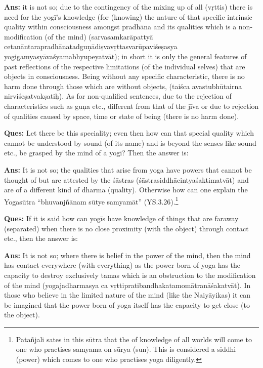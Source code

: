 \textbf{Ans:} it is not so; due to the contingency of the mixing up of all (vṛttis) there is need for the yogī’s knowledge (for (knowing) the nature of that specific intrinsic quality within consciousness amongst pradhāna and its qualities which is a non-modification (of the mind) (sarvasamkarāpattyā cetanāntarapradhānatadguṇādiṣvavṛttasvarūpaviśeṣasya yogi\-gamyasyāvaśyamabhyupeyatvāt); in short it is only the general features of past reflections of the respective limitations (of the individual selves) that are objects in consciousness. Being without any specific characteristic, there is no harm done through those which are without objects, (taiśca avastubhūtairna nirviśeṣatvakṣatiḥ). As for non-qualified sentences, due to the rejection of characteristics such as guṇa etc., different from that of the jīva or due to rejection of qualities caused by space, time or state of being (there is no harm done).

\textbf{Ques:}  Let there be this speciality; even then how can that special quality which cannot be understood by sound (of its name) and is beyond the senses like sound etc., be grasped by the mind of a yogī? Then the answer is: 

\textbf{Ans:} It is not so; the qualities that arise from yoga have powers that cannot be thought of but are attested by the śāstras (śāstrasiddhācintyaśaktimatvāt) and are of a different kind of dharma (quality). Otherwise how can one explain the Yogasūtra “bhuvanjñānam sūtye samyamāt” (YS.3.26).\footnote{Patañjali sates in this sūtra that the of knowledge of all worlds will come to one who practises samyama on sūrya (sun). This is considered a siddhi (power) which comes to one who practises yoga diligently.} 

\textbf{Ques:} If it is said how can yogīs have knowledge of things that are faraway (separated) when there is no close proximity (with the object) through contact etc., then the answer is: 

\textbf{Ans:} It is not so; where there is belief in the power of the mind, then the mind has contact everywhere (with everything) as the power born of yoga has the capacity to destroy exclusively tamas which is an obstruction to the modification of the mind (yogajadharmasya ca vṛttipratibandhakatamomātranāśakatvāt). In those who believe in the limited nature of the mind (like the Naiyāyikas) it can be imagined that the power born of yoga itself has the capacity to get close (to the object).


